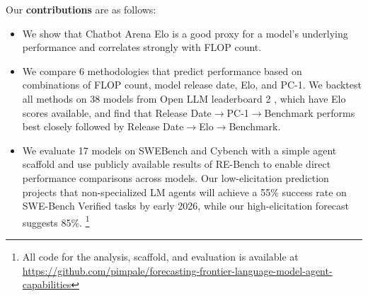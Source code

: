 Our \textbf{contributions} are as follows:
\begin{itemize}
    \item We show that Chatbot Arena Elo \citep{chatbot_arena} is a good proxy for a model's underlying performance and correlates strongly with FLOP count.%
    \item We compare 6 methodologies that predict performance based on combinations of FLOP count, model release date, Elo, and PC-1. We backtest all methods on 38 models from Open LLM leaderboard 2 \citep{open-llm-leaderboard-v2}, which have Elo scores available, and find that Release Date$\to$PC-1$\to$Benchmark performs best closely followed by Release Date$\to$Elo$\to$Benchmark.
    \item We evaluate 17 models on SWEBench and Cybench with a simple agent scaffold and use publicly available results of RE-Bench \citep{wijk2024rebenchevaluatingfrontierai} to enable direct performance comparisons across models. 
    Our low-elicitation prediction projects that non-specialized LM agents will achieve a 55\% success rate on SWE-Bench Verified tasks by early 2026, while our high-elicitation forecast suggests 85\%. \footnote{All code for the analysis, scaffold, and evaluation is available at \href{https://github.com/pimpale/forecasting-frontier-language-model-agent-capabilities}{https://github.com/pimpale/forecasting-frontier-language-model-agent-capabilities}}

\end{itemize}



